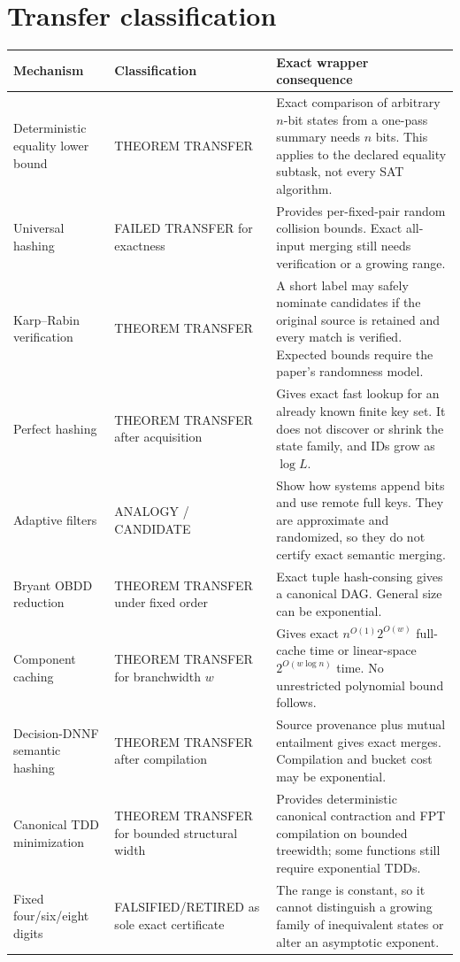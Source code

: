 \documentclass[11pt]{article}
\begin{document}
\section{Transfer classification}

\begin{longtable}{@{}p{}p{}p{}@{}}
\toprule
Mechanism & Classification & Exact wrapper consequence \\
\midrule
\endhead
Deterministic equality lower bound & THEOREM TRANSFER & Exact comparison of arbitrary
$n$-bit states from a one-pass summary needs $n$ bits.  This applies to the
declared equality subtask, not every SAT algorithm. \\
\addlinespace
Universal hashing & FAILED TRANSFER for exactness & Provides per-fixed-pair
random collision bounds.  Exact all-input merging still needs verification
or a growing range. \\
\addlinespace
Karp--Rabin verification & THEOREM TRANSFER & A short label may safely nominate
candidates if the original source is retained and every match is verified.
Expected bounds require the paper's randomness model. \\
\addlinespace
Perfect hashing & THEOREM TRANSFER after acquisition & Gives exact fast lookup
for an already known finite key set.  It does not discover or shrink the
state family, and IDs grow as $\log L$. \\
\addlinespace
Adaptive filters & ANALOGY / CANDIDATE & Show how systems append bits and use
remote full keys.  They are approximate and randomized, so they do not
certify exact semantic merging. \\
\addlinespace
Bryant OBDD reduction & THEOREM TRANSFER under fixed order & Exact tuple
hash-consing gives a canonical DAG.  General size can be exponential. \\
\addlinespace
Component caching & THEOREM TRANSFER for branchwidth $w$ & Gives exact
$n^{O(1)}2^{O(w)}$ full-cache time or linear-space
$2^{O(w\log n)}$ time.  No unrestricted polynomial bound follows. \\
\addlinespace
Decision-DNNF semantic hashing & THEOREM TRANSFER after compilation & Source
provenance plus mutual entailment gives exact merges.  Compilation and bucket
cost may be exponential. \\
\addlinespace
Canonical TDD minimization & THEOREM TRANSFER for bounded structural width &
Provides deterministic canonical contraction and FPT compilation on bounded
treewidth; some functions still require exponential TDDs. \\
\addlinespace
Fixed four/six/eight digits & FALSIFIED/RETIRED as sole exact certificate &
The range is constant, so it cannot distinguish a growing family of
inequivalent states or alter an asymptotic exponent. \\
\bottomrule
\end{longtable}
\end{document}
